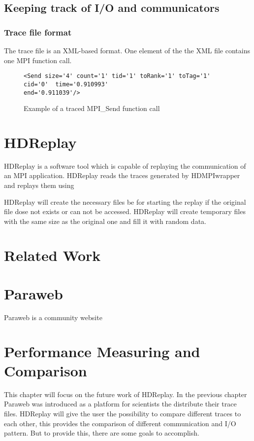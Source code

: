 \subsection{Keeping track of I/O and communicators}


\subsubsection{Trace file format}
The trace file is an XML-based format. One element of the the XML file contains
one MPI function call.

\begin{figure*}

\begin{lstlisting}
<Send size='4' count='1' tid='1' toRank='1' toTag='1' cid='0'  time='0.910993'
end='0.911039'/>
\end{lstlisting}

\caption{Example of a traced MPI\_Send function call}
\label{fig:trace-example}       %
\end{figure*}


\section{HDReplay}
\label{intro-hdreplay}

HDReplay is a software tool which is capable of replaying the communication of an
MPI application. HDReplay reads the traces generated by HDMPIwrapper and replays
them using


HDReplay will create the necessary files be for starting the replay if the
original file dose not exists or can not be accessed. HDReplay will create
temporary files with the same size as the original one and fill it with random
data.
 
\section{Related Work}


\section{Paraweb}
Paraweb is a community website


\section*{Performance Measuring and Comparison}
\label{performance}
This chapter will focus on the future work of HDReplay. In the previous chapter
Paraweb was introduced as a platform for scientists the distribute their trace
files. HDReplay will give the user the possibility to compare different traces 
to each other, this provides the comparison of different communication and I/O
pattern. But to provide this, there are some goals to accomplish. 

